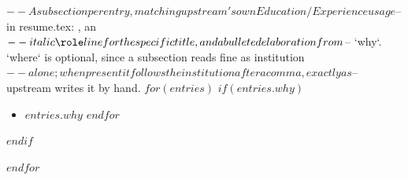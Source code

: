 $-- A subsection per entry, matching upstream's own Education/Experience usage
$-- in resume.tex: , an
$-- italic \role line for the specific title, and a bulleted elaboration from
$-- `why`. `where` is optional, since a subsection reads fine as institution
$-- alone; when present it follows the institution after a comma, exactly as
$-- upstream writes it by hand.
$for(entries)$
$if(entries.why)$
\begin{itemize}
$for(entries.why)$  \item $entries.why$
$endfor$\end{itemize}
$endif$

$endfor$
